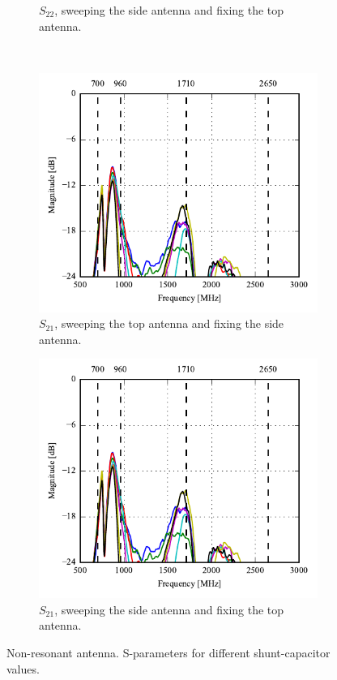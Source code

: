 \begin{figure}[htbp]
\begin{subfigure}{0.49\linewidth}
        \caption{$S_{22}$, sweeping the side antenna and fixing the top antenna.}
    \end{subfigure}
    \\
    \begin{subfigure}{0.49\linewidth}
        \centering
        \includegraphics{img/tech_sol/nonresonant/prototype/s21_csh1.pdf}
        \caption{$S_{21}$, sweeping the top antenna and fixing the side antenna.}
    \end{subfigure}
    \hfill
    \begin{subfigure}{0.49\linewidth}
        \centering
        \includegraphics{img/tech_sol/nonresonant/prototype/s12_csh1.pdf}
        \caption{$S_{21}$, sweeping the side antenna and fixing the top antenna.}
    \end{subfigure}
    \caption{Non-resonant antenna. S-parameters for different shunt-capacitor values.}
    \label{fig:nonresonant_proto_sweep_sparams}
\end{figure}

